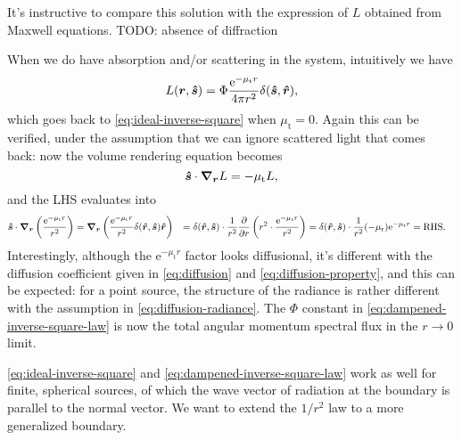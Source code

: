 \documentclass[hyperref, a4paper]{article}
\newcommand*{\ee}{\mathrm{e}}
\def\\{}%
\begin{document}
It's instructive to compare this solution with 
the expression of $L$ obtained from Maxwell equations.
TODO: absence of diffraction

When we do have absorption and/or scattering in the system, 
intuitively we have 
\begin{equation}
    L(\vb*{r}, \vu*{s}) = \Phi \frac{\ee^{- \mu_{\text{t}} r}}{4 \pi r^2} \delta(\vu*{s}, \vu*{r}),
    \label{eq:dampened-inverse-square-law}
\end{equation}
which goes back to \eqref{eq:ideal-inverse-square}
when $\mu_{\text{t}} = 0$.
Again this can be verified, under the assumption that 
we can ignore scattered light that comes back:
now the volume rendering equation becomes 
\begin{equation}
    \vu*{s} \cdot \grad_{\vb*{r}} L = - \mu_{\text{t}} L,
\end{equation}
and the LHS evaluates into 
\begin{equation}
    \begin{aligned}
        \vu*{s} \cdot \grad_{\vb*{r}} \left(
            \frac{\ee^{- \mu_{\text{t}} r}}{r^2}
        \right) &= 
        \grad_{\vb*{r}} \left(
            \frac{\ee^{- \mu_{\text{t}} r}}{r^2} 
            \delta(\vu*{r}, \vu*{s}) \vu*{r}
        \right)  \\
        &= \delta(\vu*{r}, \vu*{s}) \cdot \frac{1}{r^2} \pdv{r} \left(
            r^2 \cdot \frac{\ee^{- \mu_{\text{t}} r}}{r^2} 
        \right) \\
        &= \delta(\vu*{r}, \vu*{s}) \cdot \frac{1}{r^2} 
        (- \mu_{\text{r}}) \ee^{- \mu_{\text{t}} r} = \text{RHS}.
    \end{aligned}
\end{equation}
Interestingly, although the $\ee^{- \mu_{\text{t}} r}$ factor 
looks diffusional, 
it's different with the diffusion coefficient given in 
\eqref{eq:diffusion} and \eqref{eq:diffusion-property},
and this can be expected: for a point source, 
the structure of the radiance is rather different with 
the assumption in \eqref{eq:diffusion-radiance}.
The $\Phi$ constant in \eqref{eq:dampened-inverse-square-law}
is now the total angular momentum spectral flux 
in the $r \to 0$ limit.

\eqref{eq:ideal-inverse-square} and \eqref{eq:dampened-inverse-square-law}
work as well for finite, spherical sources,
of which the wave vector of radiation at the boundary 
is parallel to the normal vector.
We want to extend the $1/r^2$ law to a more generalized boundary.
\end{document}
